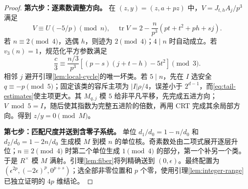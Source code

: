 \begin{proof}
\par\noindent\textbf{第六步：逐素数调整方向。}
在 $(z,y)=(z,a+pz)$ 中，$V=J_{t,h}A_j/p^3$ 满足
\[
V\equiv U(-5/p)\pmod n,\quad
\operatorname{tr}V=2-\frac n{p^3}(pt+t^2+ph+sj).
\]
若 $n\equiv2\pmod4$，选偶 $h$，则迹为 $2\pmod4$；$4\mid n$ 时自动成立。若 $v_3(n)=1$，规范化平方参数满足
\[
\frac c3\equiv\frac{n/3}{p^3}[(p-s)(j+t-h)-5t^2]\pmod3.
\]
相邻 $j$ 避开引理\ref{lem:local-cycle}的唯一坏类。若 $5\mid n$，先在 $I$ 选安全 $q\equiv-p\pmod5$；固定该类的容斥主项为 $|I|\rho/4$，误差小于 $2^{d-1}$，而\eqref{eq:tail-estimates}使主项更大。其 $M_{q,j}$ 模 $5$ 给非平凡平移，先完成五进方向；$V\bmod5=I$，随后使其指数为完整五进阶的倍数，再用 CRT 完成其余局部方向。得到 $z/y=0\pmod M$。

\par\noindent\textbf{第七步：匹配尺度并送到含零子系统。}
单位 $d_1/d_0=1-n/d_0$ 和 $d_2/d_0=1-2n/d_0$ 生成模 $M$ 到模 $n$ 的单位核。奇素数处由二项式展开逐层升位；$n\equiv2\pmod4$ 时第二个单位生成 $1\pmod4$ 的部分，第一个补另一个类。于是 $R^\times$ 模 $M$ 满射。引理\ref{lem:fiber}将列精确送到 $(0,\epsilon)$。最终配置为 $(\epsilon^{2p},(-2\epsilon)^p,0^{p+s})$；选全部非零位置和 $p$ 个零，使用引理\ref{lem:integer-range}已独立证明的 $4p$ 维结论。
\end{proof}

